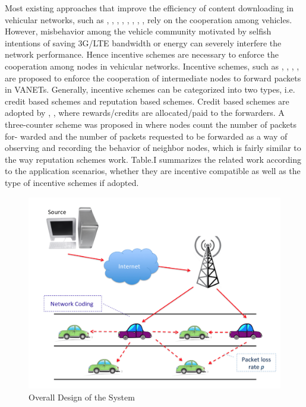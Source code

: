 \documentclass{acm_proc_article-sp}
\begin{document}
Most existing approaches that improve the efficiency of content downloading in vehicular networks, such as \cite{urban}, \cite{symbol}, \cite{cost}, \cite{indoor}, \cite{opti}, \cite{ondemand}, \cite{datadissem}, \cite{globecom}, rely on the cooperation among vehicles. However, misbehavior among the vehicle community motivated by selfish intentions of saving 3G/LTE bandwidth or energy can severely interfere the network performance. Hence incentive schemes are necessary to enforce the cooperation among nodes in vehicular networks. Incentive schemes, such as \cite{coalitional}, \cite{coop}, \cite{incentive}, \cite{uncoop}, are proposed to enforce the cooperation of intermediate nodes to forward packets in VANETs. Generally, incentive schemes can be categorized into two types, i.e. credit based schemes and reputation based schemes. Credit based schemes are adopted by \cite{coalitional}, \cite{incentive}, \cite{uncoop} where rewards/credits are allocated/paid to the forwarders. A three-counter scheme was proposed in \cite{coop} where nodes count the number of packets for- warded and the number of packets requested to be forwarded as a way of observing and recording the behavior of neighbor nodes, which is fairly similar to the way reputation schemes work. Table.I summarizes the related work according to the application scenarios, whether they are incentive compatible as well as the type of incentive schemes if adopted.

\begin{figure}
\centering
\includegraphics[scale=.30]{design.png} \caption{Overall Design of the System}
\label{design}
\end{figure}
\end{document}
